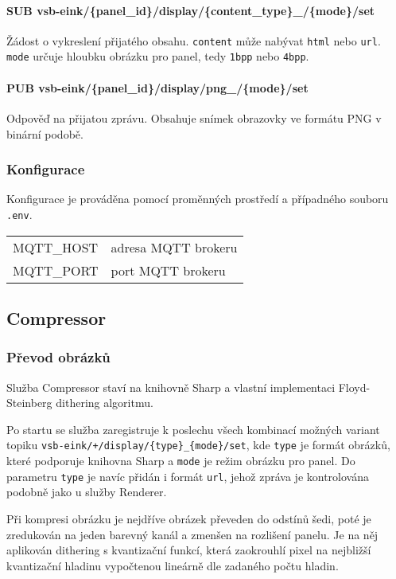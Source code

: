 \paragraph*{SUB vsb-eink/\{panel\_id\}/display/\{content\_type\}\_/\{mode\}/set} Žádost o vykreslení přijatého obsahu. \lstinline|content| může nabývat \lstinline|html| nebo \lstinline|url|. \lstinline|mode| určuje hloubku obrázku pro panel, tedy \lstinline|1bpp| nebo \lstinline|4bpp|.

\paragraph*{PUB vsb-eink/\{panel\_id\}/display/png\_/\{mode\}/set} Odpověď na přijatou zprávu. Obsahuje snímek obrazovky ve formátu PNG v binární podobě.

\subsubsection{Konfigurace}
Konfigurace je prováděna pomocí proměnných prostředí a případného souboru \lstinline{.env}.
\begin{table}[h]
    \begin{tabular}{ll}
        MQTT\_HOST & adresa MQTT brokeru \\
        MQTT\_PORT & port MQTT brokeru \\
    \end{tabular}
\end{table}

\subsection{Compressor}
\subsubsection{Převod obrázků}
Služba Compressor staví na knihovně Sharp \cite{fullerLovellSharp2024} a vlastní implementaci Floyd-Steinberg dithering algoritmu.

Po startu se služba zaregistruje k poslechu všech kombinací možných variant topiku \lstinline|vsb-eink/+/display/{type}_{mode}/set|, kde \lstinline|type| je formát obrázků, které podporuje knihovna Sharp a \lstinline|mode| je režim obrázku pro panel. Do parametru \lstinline|type| je navíc přidán i formát \lstinline|url|, jehož zpráva je kontrolována podobně jako u služby Renderer.

Při kompresi obrázku je nejdříve obrázek převeden do odstínů šedi, poté je zredukován na jeden barevný kanál a zmenšen na rozlišení panelu. Je na něj aplikován dithering s kvantizační funkcí, která zaokrouhlí pixel na nejbližší kvantizační hladinu vypočtenou lineárně dle zadaného počtu hladin.

